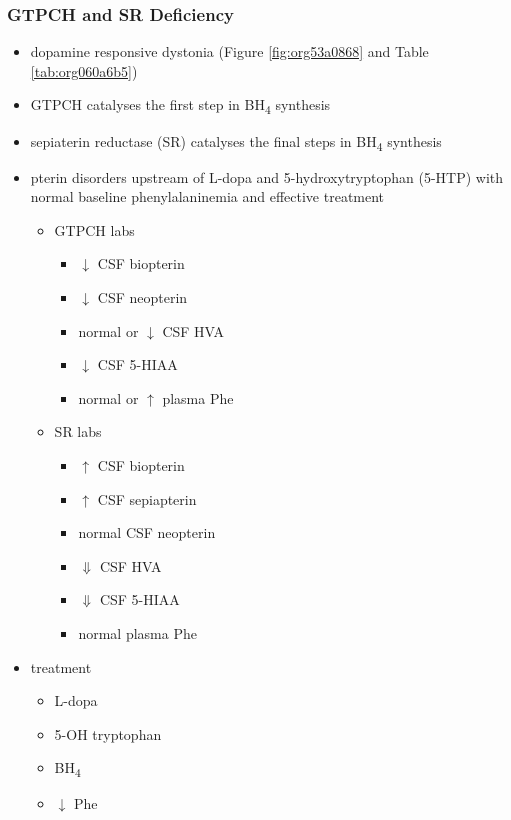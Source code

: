 \documentclass[12pt]{scrartcl}
\begin{document}
\subsubsection{GTPCH and SR Deficiency}
\label{sec:orgf5c2d1c}
\begin{itemize}
\item dopamine responsive dystonia (Figure \ref{fig:org53a0868} and Table \ref{tab:org060a6b5})
\item GTPCH catalyses the first step in BH\textsubscript{4} synthesis
\item sepiaterin reductase (SR) catalyses the final steps in BH\textsubscript{4} synthesis
\item pterin disorders upstream of L-dopa and 5-hydroxytryptophan
(5-HTP) with normal baseline phenylalaninemia and effective
treatment
\begin{itemize}
\item GTPCH labs
\begin{itemize}
\item \(\downarrow\) CSF biopterin
\item \(\downarrow\) CSF neopterin
\item normal or \(\downarrow\) CSF HVA
\item \(\downarrow\) CSF 5-HIAA
\item normal or \(\uparrow\) plasma Phe
\end{itemize}
\item SR labs
\begin{itemize}
\item \(\uparrow\) CSF biopterin
\item \(\uparrow\) CSF sepiapterin
\item normal CSF neopterin
\item \(\Downarrow\) CSF HVA
\item \(\Downarrow\) CSF 5-HIAA
\item normal plasma Phe
\end{itemize}
\end{itemize}
\item treatment
\begin{itemize}
\item L-dopa
\item 5-OH tryptophan
\item BH\textsubscript{4}
\item \(\downarrow\) Phe
\end{itemize}
\end{itemize}
\end{document}
